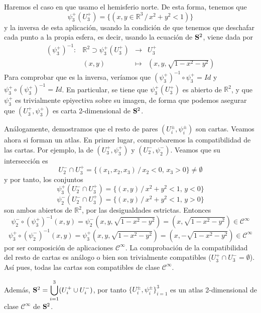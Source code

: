 \begin{sol}
    Haremos el caso en que usamo el hemisferio norte. De esta forma, tenemos que 
    $$\psi_3^+(U_3^+)=\{(x,y \in \mathbb R^3 \, / \, x^2+y^2 < 1)\}$$
    y la inversa de esta aplicaci\'on, usando la condici\'on de que tenemos que deschafar cada punto a la propia esfera, es decir, usando la ecuaci\'on de $\bold{S}^2$, viene dada por
    $$\begin{array}{rrcl}
         (\psi_3^+)^{-1}: & \mathbb R^2 \supset \psi_3^+(U_3^+) & \longrightarrow & U_3^+  \\
         & (x,y) & \longmapsto & (x,y,\sqrt{1-x^2-y^2})
    \end{array}$$
    Para comprobar que es la inversa, ver\'iamos que $(\psi_3^+)^{-1} \circ \psi_3^+ = Id$ y $\psi_3^+ \circ(\psi_3^+)^{-1}=Id$. En particular, se tiene que $\psi_3^+(U_3^+)$ es abierto de $\mathbb R^2$, y que $\psi_3^+$ es trivialmente epiyectiva sobre su imagen, de forma que podemos asegurar que $(U_3^+, \psi_3^+)$ es carta 2-dimensional de $\bold{S}^2$.

    An\'alogamente, demostramos que el resto de pares $(U_i^{\pm}, \psi_i^{\pm})$ son cartas. Veamos ahora si forman un atlas. En primer lugar, comprobaremos la compatibilidad de las cartas. Por ejemplo, la de $(U_3^+, \psi_3^+)$ y $(U_2^-, \psi_2^-)$. Veamos que su intersecci\'on es
    $$U_2^-\cap U_3^+ = \{(x_1, x_2, x_3) \, / \, x_2 < 0, \, x_3 >0\} \neq \emptyset$$
    y por tanto, los conjuntos
    $$\psi_3^+ (U_2^-\cap U_3^+) = \{(x,y) \, / \, x^2 + y^2 < 1, \, y< 0\}$$
    $$\psi_2^- (U_2^-\cap U_3^+) = \{(x,y) \, / \, x^2 + y^2 < 1, \, y> 0\}$$
    son ambos abiertos de $\mathbb R^2$, por las desigualdades estrictas. Entonces
    $$\psi_2^- \circ (\psi_3^+)^{-1} (x,y) = \psi_2^-\left(x,y,\sqrt{1-x^2-y^2}\right)= \left(x,\sqrt{1-x^2-y^2}\right) \in \mathcal{C}^{\infty}$$
    $$\psi_3^+ \circ (\psi_2^-)^{-1} (x,y) = \psi_3^+\left(x,y,\sqrt{1-x^2-y^2}\right)= \left(x,-\sqrt{1-x^2-y^2}\right)\in \mathcal{C}^{\infty}$$
    por ser composici\'on de aplicaciones $ \mathcal{C}^{\infty}$. La comprobaci\'on de la compatibilidad del resto de cartas es an\'alogo o bien son trivialmente compatibles ($U_3^+ \cap U_3^- = \emptyset$). As\'i pues, todas las cartas son compatibles de clase $\mathcal{C}^{\infty}$. 

    Adem\'as, $\bold{S}^2 = \displaystyle \bigcup_{i=1}^3 (U_i^+ \cup U_i^-)$, por tanto $\{U_i^{\pm}, \psi_i^{\pm}\}_{i=1}^3$ es un atlas 2-dimensional de clase $\mathcal{C}^{\infty}$ de $\bold{S}^2$. 
\end{sol}
